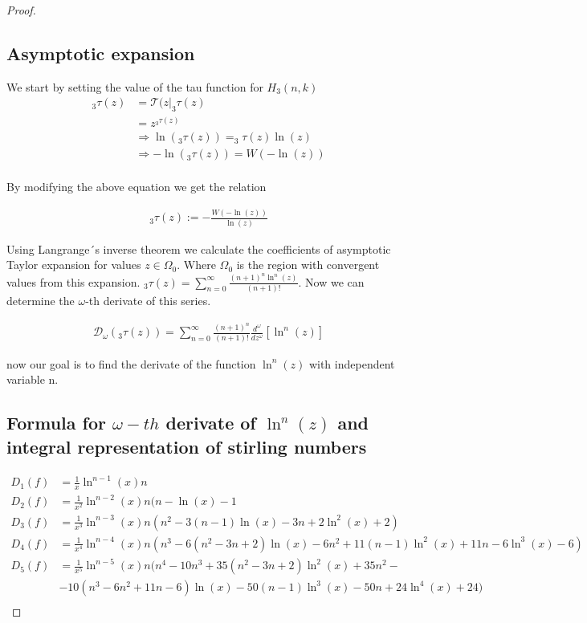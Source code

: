 \begin{proof}
      \subsection{Asymptotic expansion }
      We start by setting the value of the tau function for \(H_3(n , k)\)
      \begin{align}
            _3\tau(z) &= \mathcal{T}(z | _3\tau(z) \\
            &= z^{_3\tau(z)} \\
            &\Longrightarrow \ln(_3\tau(z)) = _3\tau(z) \ln(z) \\
            &\Longrightarrow -\ln(_3\tau(z)) = W(-\ln(z)) \\
      \end{align}
      
      By modifying the above equation we get the relation
      
      \begin{align}
            _3\tau(z) := -\frac{W(-\ln(z))}{\ln(z)}
      \label{relation1}
      \end{align}
      
      Using Langrange´s inverse theorem we calculate
      the coefficients of asymptotic Taylor expansion 
      for values \(z \in \Omega_0\). Where \(\Omega_0\)
      is the region with convergent values from this 
      expansion.  \(_3\tau(z) = \sum_{n=0}^\infty 
      \frac{(n+1)^n \ln^n(z)}{(n+1)!}\). Now we can 
      determine the \(\omega\)-th derivate of this series.
      
      \begin{align}
            \mathcal{D}_\omega(_3\tau(z)) = 
            \sum_{n=0}^\infty \frac{(n+1)^n}{(n+1)!}
            \frac{d^\omega}{dz^\omega}[\ln^n(z)]
      \end{align}
      
      now our goal is to find the derivate of the
      function \(\ln^n(z)\) with independent variable n. 
      \subsection{Formula for \(\omega-th\) derivate 
      of \(\ln^n(z)\) and integral representation of stirling numbers}
      
      \begin{align}
            D_1(f) &= \frac{1}{x}\ln^{n-1}(x)n \\
            D_2(f) &= \frac{1}{x^2}\ln^{n-2}(x)n
            (n-\ln(x)-1 \\
            D_3(f) &= \frac{1}{x^3}\ln^{n-3}(x)n 
            (n^2 - 3(n-1) \ln(x) - 3n + 2 \ln^2(x)+2) \\
            D_4(f) &= \frac{1}{x^4}\ln^{n-4}(x)n 
            (n^3 - 6(n^2-3n+2)\ln(x)-6n^2 + 11(n-1) 
            \ln^2(x)+11n-6\ln^3(x)-6) \\
            D_5(f) &= \frac{1}{x^5}\ln^{n-5}(x)n 
            (n^4 - 10n^3 + 35(n^2-3n+2)\ln^2(x) + 35n^2 - \\
            & - 10 (n^3-6n^2 +11n-6)\ln(x)-50(n-1)
            \ln^3(x) - 50n+24\ln^4(x)+24)\\
      \end{align}
      

\end{proof}
